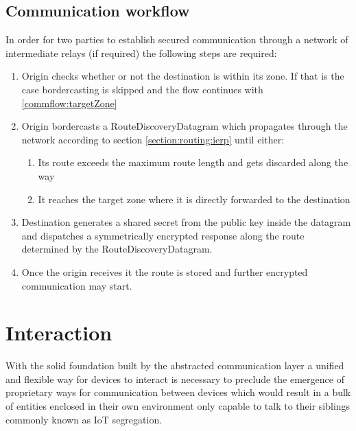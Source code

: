 \documentclass[a4paper]{report}
\begin{document}
        \section{Communication workflow}
            In order for two parties to establish secured communication through a network of intermediate relays (if required) the following steps are required:
            \begin{enumerate}
                \item Origin checks whether or not the destination is within its zone. If that is the case bordercasting is skipped and the flow continues with \ref{commflow:targetZone}
                \item Origin bordercasts a RouteDiscoveryDatagram which propagates through the network according to section \ref{section:routing:ierp} until either:
                    \begin{enumerate}[label=(\Alph*)]
                        \item Its route exceeds the maximum route length and gets discarded along the way
                        \item It reaches the target zone where it is directly forwarded to the destination \label{commflow:targetZone}
                    \end{enumerate}
                \item Destination generates a shared secret from the public key inside the \gls{datagram} and dispatches a symmetrically encrypted response along the route determined by the RouteDiscoveryDatagram. %
                \item Once the origin receives it the route is stored and further encrypted communication may start.
            \end{enumerate}
            
    \chapter{Interaction}
        With the solid foundation built by the abstracted communication layer a unified and flexible way for \glspl{device} to interact is necessary to preclude the emergence of proprietary ways for communication between devices which would result in a bulk of entities enclosed in their own environment only capable to talk to their siblings commonly known as IoT segregation.
        \newpage
\end{document}
